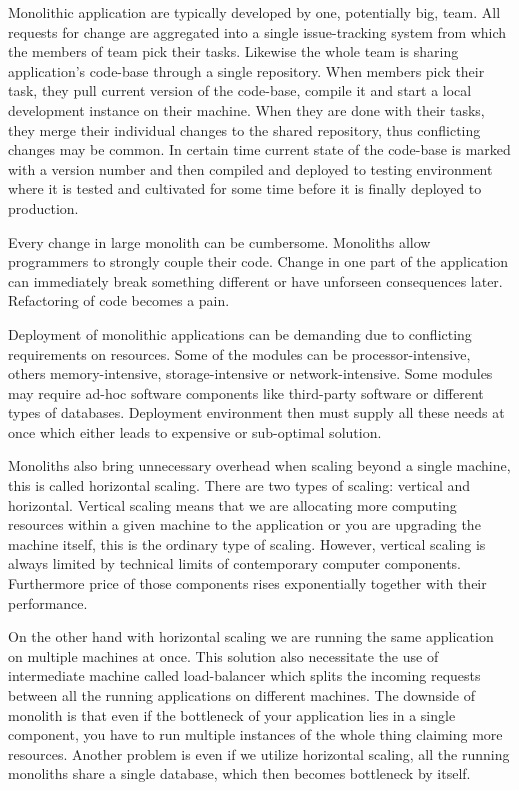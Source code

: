\documentclass[12pt,oneside]{fithesis2}
\begin{document}
Monolithic application are typically developed by one, potentially big, team. All requests for change are aggregated into a single issue-tracking system from which the members of team pick their tasks. Likewise the whole team is sharing application's code-base through a single repository. When members pick their task, they pull current version of the code-base, compile it and start a local development instance on their machine. When they are done with their tasks, they merge their individual changes to the shared repository, thus conflicting changes may be common. In certain time current state of the code-base is marked with a version number and then compiled and deployed to testing environment where it is tested and cultivated for some time before it is finally deployed to production.

Every change in large monolith can be cumbersome. Monoliths allow programmers to strongly couple their code. Change in one part of the application can immediately break something different or have unforseen consequences later. Refactoring of code becomes a pain.

Deployment of monolithic applications can be demanding due to conflicting  requirements on resources. Some of the modules can be processor-intensive, others memory-intensive, storage-intensive or network-intensive. Some modules may require ad-hoc software components like third-party software or different types of databases. Deployment environment then must supply all these needs at once which either leads to expensive or sub-optimal solution.

Monoliths also bring unnecessary overhead when scaling beyond a single machine, this is called horizontal scaling. There are two types of scaling: vertical and horizontal. Vertical scaling means that we are allocating more computing resources within a given machine to the application or you are upgrading the machine itself, this is the ordinary type of scaling. However, vertical scaling is always limited by technical limits of contemporary computer components. Furthermore price of those components rises exponentially together with their performance.

On the other hand with horizontal scaling we are running the same application on multiple machines at once. This solution also necessitate the use of intermediate machine called load-balancer which splits the incoming requests between all the running applications on different machines. The downside of monolith is that even if the bottleneck of your application lies in a single component, you have to run multiple instances of the whole thing claiming more resources. Another problem is even if we utilize horizontal scaling, all the running monoliths share a single database, which then becomes bottleneck by itself.
\end{document}
